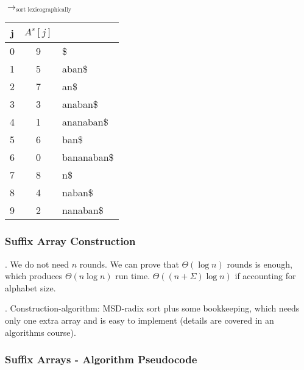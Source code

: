 \documentclass{article}
\begin{document}
\begin{examplee}[]
\begin{center}
\begin{tabular}{c|l}
        \end{tabular}
        \hspace{1cm} %
        $\longrightarrow_{\text{sort lexicographically}}$ 
        \hspace{1cm}
        \begin{tabular}{c|c|l}
            \hline
            \textbf{j} & \textbf{$A^s[j]$} & \textbf{} \\ \hline
            0 & 9 & \$ \\
            1 & 5 & aban\$ \\
            2 & 7 & an\$ \\
            3 & 3 & anaban\$ \\
            4 & 1 & ananaban\$ \\
            5 & 6 & ban\$ \\
            6 & 0 & bananaban\$ \\
            7 & 8 & n\$ \\
            8 & 4 & naban\$ \\
            9 & 2 & nanaban\$ \\ \hline
        \end{tabular}
    \end{center}
\end{examplee}

\subsubsection{Suffix Array Construction}

\begin{thmm}[].
    We do not need $n$ rounds. We can prove that $\Theta(\log n)$ rounds is enough, which produces $\Theta(n \log n)$ run time. $\Theta((n + \Sigma) \log n)$ if accounting for alphabet size. 
\end{thmm}

\begin{comm}[].
    Construction-algorithm: MSD-radix sort plus some bookkeeping, which needs only one extra array and is easy to implement (details are covered in an algorithms course). 
\end{comm}

\newpage
\subsubsection{Suffix Arrays - Algorithm Pseudocode}
\end{document}
